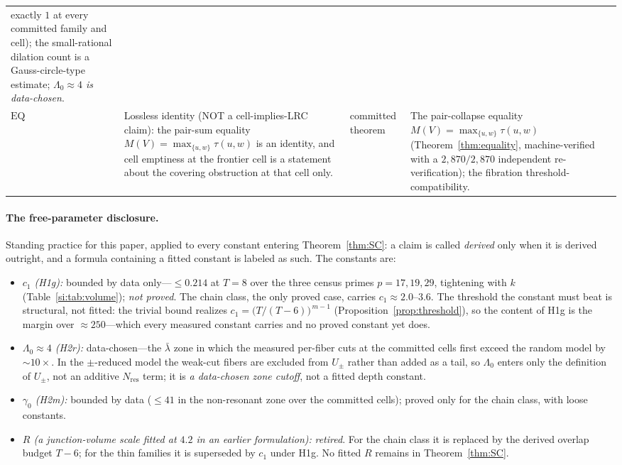 {\begin{longtable}{@{}p{}p{}
                   p{}p{}@{}}
exactly $1$ at every committed family and cell); the small-rational
dilation count is a Gauss-circle-type estimate;
\emph{$\Lambda_0\approx 4$ is data-chosen}. \\
$\mathrm{EQ}$ &
Lossless identity (NOT a cell-implies-LRC claim): the pair-sum equality
$M(V)=\max_{\{u,w\}}\tau(u,w)$ is an identity, and cell emptiness at the
frontier cell is a statement about the covering obstruction at that cell
only. &
committed theorem &
The pair-collapse equality
$M(V)=\max_{\{u,w\}}\tau(u,w)$ (Theorem~\ref{thm:equality},
machine-verified with a $2{,}870/2{,}870$ independent re-verification);
the fibration threshold-compatibility. \\
\end{longtable}
}

\paragraph{The free-parameter disclosure.}
Standing practice for this paper, applied to every constant entering
Theorem~\ref{thm:SC}: a claim is called \emph{derived} only when it is
derived outright, and a formula containing a fitted constant is labeled
as such. The constants are:
\begin{itemize}[leftmargin=2.2em,itemsep=2pt,topsep=2pt]
\item \emph{$c_1$ (H1g):} bounded by data only---$\le 0.214$ at $T=8$
  over the three census primes $p=17,19,29$, tightening with $k$
  (Table~\ref{si:tab:volume}); \emph{not proved}. The chain class, the only
  proved case, carries $c_1\approx 2.0$--$3.6$. The threshold the
  constant must beat is structural, not fitted: the trivial bound
  realizes $c_1=\bigl(T/(T-6)\bigr)^{\,m-1}$
  (Proposition~\ref{prop:threshold}), so the content of H1g is the
  margin over $\approx250$---which every measured constant carries and
  no proved constant yet does.
\item \emph{$\Lambda_0\approx 4$ (H2r):} data-chosen---the $\bar\lambda$ zone in
which the measured per-fiber cuts at the committed cells first exceed the random
model by $\sim 10\times$. In the $\pm$-reduced model the weak-cut fibers are
excluded from $U_\pm$ rather than added as a tail, so $\Lambda_0$ enters only
the definition of $U_\pm$, not an additive $N_{\mathrm{res}}$ term; it is
\emph{a data-chosen zone cutoff}, not a fitted depth constant.
\item \emph{$\gamma_0$ (H2m):} bounded by data ($\le 41$ in the
  non-resonant zone over the committed cells); proved only for the chain
  class, with loose constants.
\item \emph{$R$ (a junction-volume scale fitted at $4.2$ in an earlier
  formulation):} \emph{retired}. For the chain class it is replaced by
  the derived overlap budget $T-6$; for the thin families it is
  superseded by $c_1$ under H1g. No fitted $R$ remains in
  Theorem~\ref{thm:SC}.
\end{itemize}
